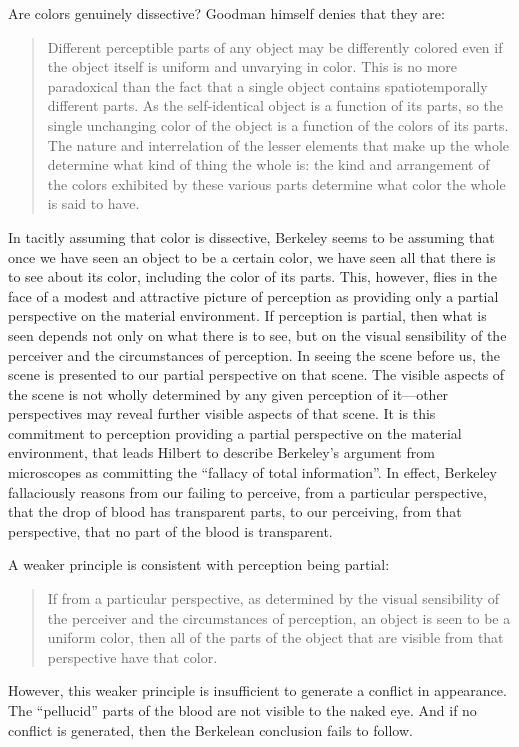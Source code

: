 \documentclass[12pt]{article}
\begin{document}
Are colors genuinely dissective? Goodman himself denies that they are:
\begin{quote}
	Different perceptible parts of any object may be differently colored even if the object itself is uniform and unvarying in color. This is no more paradoxical than the fact that a single object contains spatiotemporally different parts. As the self-identical object is a function of its parts, so the single unchanging color of the object is a function of the colors of its parts. The nature and interrelation of the lesser elements that make up the whole determine what kind of thing the whole is: the kind and arrangement of the colors exhibited by these various parts determine what color the whole is said to have. \citep[130]{Goodman:1951ww}
\end{quote}
In tacitly assuming that color is dissective, Berkeley seems to be assuming that once we have seen an object to be a certain color, we have seen all that there is to see about its color, including the color of its parts. This, however, flies in the face of a modest and attractive picture of perception as providing only a partial perspective on the material environment. If perception is partial, then what is seen depends not only on what there is to see, but on the visual sensibility of the perceiver and the circumstances of perception. In seeing the scene before us, the scene is presented to our partial perspective on that scene. The visible aspects of the scene is not wholly determined by any given perception of it---other perspectives may reveal further visible aspects of that scene. It is this commitment to perception providing a partial perspective on the material environment, that leads Hilbert to describe Berkeley's argument from microscopes as committing the ``fallacy of total information''. In effect, Berkeley fallaciously reasons from our failing to perceive, from a particular perspective, that the drop of blood has transparent parts, to our perceiving, from that perspective, that no part of the blood is transparent.

A weaker principle is consistent with perception being partial:
	\begin{quote}
		If from a particular perspective, as determined by the visual sensibility of the perceiver and the circumstances of perception, an object is seen to be a uniform color, then all of the parts of the object that are visible from that perspective have that color.
	\end{quote}
However, this weaker principle is insufficient to generate a conflict in appearance. The ``pellucid'' parts of the blood are not visible to the naked eye. And if no conflict is generated, then the Berkelean conclusion fails to follow.
\end{document}
